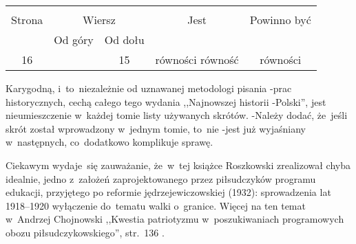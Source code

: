 \documentclass[a4paper,11pt]{article}
\begin{document}
\vspace{\spaceTwo}






\begin{center}
  \begin{tabular}{|c|c|c|c|c|}
    \hline
    & \multicolumn{2}{c|}{} & & \\
    Strona & \multicolumn{2}{c|}{Wiersz}& Jest & Powinno być \\ \cline{2-3}
    & Od góry & Od dołu &  &  \\ \hline
    16 & & 15 & równości równość & równości \\
    \hline
  \end{tabular}
\end{center}

\vspace{\spaceTwo}





\newpage




\start Karygodną, i~to~niezależnie od uznawanej metodologi pisania
-prac historycznych, cechą całego tego wydania ,,Najnowszej historii
-Polski'', jest nieumieszczenie w~każdej tomie listy używanych
skrótów. -Należy dodać, że~jeśli skrót został wprowadzony w~jednym
tomie, to~nie -jest już wyjaśniany w~następnych, co~dodatkowo
komplikuje sprawę.

\vspace{\spaceFour}


\start Ciekawym wydaje~się zauważanie, że~w~tej książce Roszkowski
zrealizował chyba idealnie, jedno z~założeń zaprojektowanego przez
piłsudczyków programu edukacji, przyjętego po reformie
jędrzejewiczowskiej (1932): sprowadzenia lat 1918--1920 wyłączenie
do~tematu walki o~granice. Więcej na ten temat \\
w~Andrzej Chojnowski ,,Kwestia patriotyzmu w~poszukiwaniach
programowych obozu piłsudczykowskiego'', str.~136
\cite{PatriotyzmPolakow06}.
\end{document}
